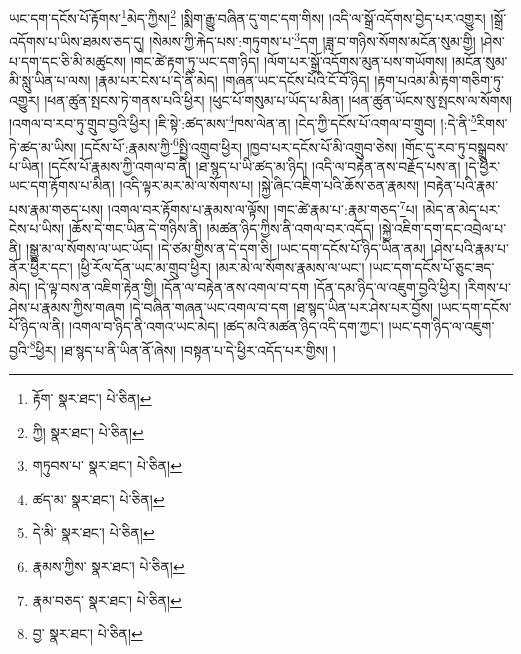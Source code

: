 ཡང་དག་དངོས་པོ་རྟོགས་\footnote{རྟོག་  སྣར་ཐང་།  པེ་ཅིན། }མེད་ཀྱིས།\footnote{ཀྱི།  སྣར་ཐང་།  པེ་ཅིན། } །སྨིག་རྒྱུ་བཞིན་དུ་གང་དག་གིས། །འདི་ལ་སྒྲོ་འདོགས་བྱེད་པར་འགྱུར། །སྒྲོ་འདོགས་པ་ཡིས་ཐམས་ཅད་དུ། །སེམས་ཀྱི་རྐེད་པས་:གཏུགས་པ་\footnote{གཏུབས་པ་  སྣར་ཐང་།  པེ་ཅིན། }དག །ཟླ་བ་གཉིས་སོགས་མངོན་སུམ་གྱི། །ཤེས་པ་དག་དང་ཅི་མི་མཚུངས། །གང་ཚེ་རྟག་ཏུ་ཡང་དག་ཉིད། །ལོག་པར་སྒྲོ་འདོགས་མུན་པས་གཡོགས། །མངོན་སུམ་མི་སླུ་ཡིན་པ་ལས། །རྣམ་པར་ངེས་པ་དེ་ནི་མེད། །གཞན་ཡང་དངོས་པོའི་ངོ་བོ་ཉིད། །རྟག་པའམ་མི་རྟག་གཅིག་ཏུ་འགྱུར། །ཕན་ཚུན་སྤངས་ཏེ་གནས་པའི་ཕྱིར། །ཕུང་པོ་གསུམ་པ་ཡོད་པ་མིན། །ཕན་ཚུན་ཡོངས་སུ་སྤངས་ལ་སོགས། །འགལ་བ་རབ་ཏུ་གྲུབ་བྱའི་ཕྱིར། །ཇི་སྟེ་:ཚད་མས་\footnote{ཚད་མ་  སྣར་ཐང་།  པེ་ཅིན། }ཁས་ལེན་ན། །ངེད་ཀྱི་དངོས་པོ་འགལ་བ་གྲུབ། །:དེ་ནི་\footnote{དེ་མི་  སྣར་ཐང་།  པེ་ཅིན། }རིགས་ཏེ་ཚད་མ་ཡིས། །དངོས་པོ་:རྣམས་ཀྱི་\footnote{རྣམས་ཀྱིས་  སྣར་ཐང་།  པེ་ཅིན། }སྤྱི་འགྲུབ་ཕྱིར། །ཁྱབ་པར་དངོས་པོ་མི་འགྲུབ་ཅེས། །གོང་དུ་རབ་ཏུ་བསྒྲུབས་པ་ཡིན། །དངོས་པོ་རྣམས་ཀྱི་འགལ་བ་ནི། །ཐ་སྙད་པ་ཡི་ཚད་མ་ཉིད། །འདི་ལ་བརྟེན་ནས་བརྗོད་པས་ན། །དེ་ཕྱིར་ཡང་དག་རྟོགས་པ་མིན། །འདི་ལྟར་མར་མེ་ལ་སོགས་པ། །སྐྱེ་ཞིང་འཇིག་པའི་ཆོས་ཅན་རྣམས། །བརྟེན་པའི་རྣམ་པས་རྣམ་གཅད་པས། །འགལ་བར་རྟོགས་པ་རྣམས་ལ་ལྟོས། །གང་ཚེ་རྣམ་པ་:རྣམ་གཅད་\footnote{རྣམ་བཅད་  སྣར་ཐང་།  པེ་ཅིན། }པ། །མེད་ན་མེད་པར་ངེས་པ་ཡིས། །ཆོས་དེ་གང་ཡིན་དེ་གཉིས་ནི། །མཚན་ཉིད་ཀྱིས་ནི་འགལ་བར་འདོད། །སྐྱེ་འཇིག་དག་དང་འབྲེལ་པ་ནི། །སྒྱུ་མ་ལ་སོགས་ལ་ཡང་ཡོད། །དེ་ཙམ་གྱིས་ན་དེ་དག་ཅི། །ཡང་དག་དངོས་པོ་ཉིད་ཡིན་ནམ། །ཤེས་པའི་རྣམ་པ་ནོར་ཕྱིར་དང་། །ཕྱི་རོལ་དོན་ཡང་མ་གྲུབ་ཕྱིར། །མར་མེ་ལ་སོགས་རྣམས་ལ་ཡང་། །ཡང་དག་དངོས་པོ་ཅུང་ཟད་མེད། །དེ་ལྟ་བས་ན་འཇིག་རྟེན་གྱི། །དོན་ལ་བརྟེན་ནས་འགལ་བ་དག །དོན་དམ་ཉིད་ལ་འཇུག་བྱའི་ཕྱིར། །རིགས་པ་ཤེས་པ་རྣམས་ཀྱིས་གཞག །དེ་བཞིན་གཞན་ཡང་འགལ་བ་དག །ཐ་སྙད་ཡིན་པར་ཤེས་པར་བྱོས། །ཡང་དག་དངོས་པོ་ཉིད་ལ་ནི། །འགལ་བ་ཉིད་ནི་འགའ་ཡང་མེད། །ཚད་མའི་མཚན་ཉིད་འདི་དག་ཀྱང་། །ཡང་དག་ཉིད་ལ་འཇུག་བྱའི་\footnote{བྱ་  སྣར་ཐང་།  པེ་ཅིན། }ཕྱིར། །ཐ་སྙད་པ་ནི་ཡིན་ནོ་ཞེས། །བསྟན་པ་དེ་ཕྱིར་འདོད་པར་གྱིས། །
